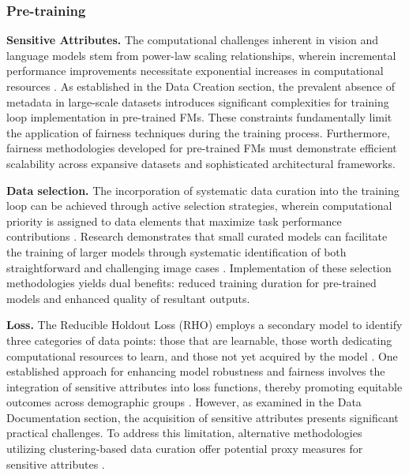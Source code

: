 \subsubsection{Pre-training}
\textbf{Sensitive Attributes.} The computational challenges inherent in vision and language models stem from power-law scaling relationships, wherein incremental performance improvements necessitate exponential increases in computational resources \cite{goyal_self-supervised_2021, goyal_vision_2022}. As established in the Data Creation section, the prevalent absence of metadata in large-scale datasets introduces significant complexities for training loop implementation in pre-trained FMs. These constraints fundamentally limit the application of fairness techniques during the training process. Furthermore, fairness methodologies developed for pre-trained FMs must demonstrate efficient scalability across expansive datasets and sophisticated architectural frameworks.

\textbf{Data selection.} The incorporation of systematic data curation into the training loop can be achieved through active selection strategies, wherein computational priority is assigned to data elements that maximize task performance contributions \cite{schaul_prioritized_2015}. Research demonstrates that small curated models can facilitate the training of larger models through systematic identification of both straightforward and challenging image cases \cite{evans_bad_2024, evans_data_2024}. Implementation of these selection methodologies yields dual benefits: reduced training duration for pre-trained models and enhanced quality of resultant outputs.
 
\textbf{Loss.} The Reducible Holdout Loss (RHO) employs a secondary model to identify three categories of data points: those that are learnable, those worth dedicating computational resources to learn, and those not yet acquired by the model \cite{mindermann_prioritized_2022}. One established approach for enhancing model robustness and fairness involves the integration of sensitive attributes into loss functions, thereby promoting equitable outcomes across demographic groups \cite{mandal_ensuring_2020}. However, as examined in the Data Documentation section, the acquisition of sensitive attributes presents significant practical challenges. To address this limitation, alternative methodologies utilizing clustering-based data curation \cite{vo_automatic_2024} offer potential proxy measures for sensitive attributes \cite{queiroz_using_2025}.

